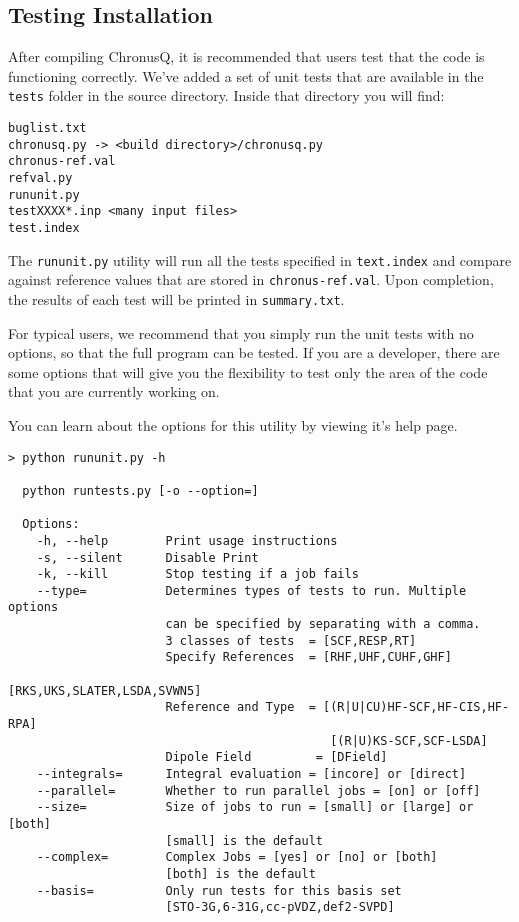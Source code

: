 \documentclass[12pt]{article}
\begin{document}
    \subsection{Testing Installation} \label{subsec:ChronusQTest}

    After compiling ChronusQ, it is recommended that users test that
    the code is functioning correctly. We've added a set of unit tests that are 
    available in the \texttt{tests} folder in the source directory. Inside that 
    directory you will find:
    
    \begin{lstlisting}
buglist.txt
chronusq.py -> <build directory>/chronusq.py
chronus-ref.val
refval.py
rununit.py
testXXXX*.inp <many input files>
test.index
    \end{lstlisting}

    \noindent The \texttt{rununit.py} utility will run all the tests specified in \texttt{text.index} 
    and compare against reference values that are stored in \texttt{chronus-ref.val}. Upon 
    completion, the results of each test will be printed in \texttt{summary.txt}. 
    
    For typical users, we recommend that you simply run the unit tests with no options, so that the 
    full program can be tested. If you are a developer, there are some options that will give you the 
    flexibility to test only the area of the code that you are currently working on. 
        
    You can learn about the options for this utility by viewing it's help page. 
    \begin{lstlisting}
> python rununit.py -h

  python runtests.py [-o --option=]

  Options:
    -h, --help        Print usage instructions
    -s, --silent      Disable Print
    -k, --kill        Stop testing if a job fails
    --type=           Determines types of tests to run. Multiple options
                      can be specified by separating with a comma.
                      3 classes of tests  = [SCF,RESP,RT]
                      Specify References  = [RHF,UHF,CUHF,GHF]
                                             [RKS,UKS,SLATER,LSDA,SVWN5]
                      Reference and Type  = [(R|U|CU)HF-SCF,HF-CIS,HF-RPA]
                                             [(R|U)KS-SCF,SCF-LSDA]
                      Dipole Field         = [DField]
    --integrals=      Integral evaluation = [incore] or [direct]
    --parallel=       Whether to run parallel jobs = [on] or [off]
    --size=           Size of jobs to run = [small] or [large] or [both]
                      [small] is the default
    --complex=        Complex Jobs = [yes] or [no] or [both]
                      [both] is the default
    --basis=          Only run tests for this basis set
                      [STO-3G,6-31G,cc-pVDZ,def2-SVPD]
    \end{lstlisting}
   
\end{document}
